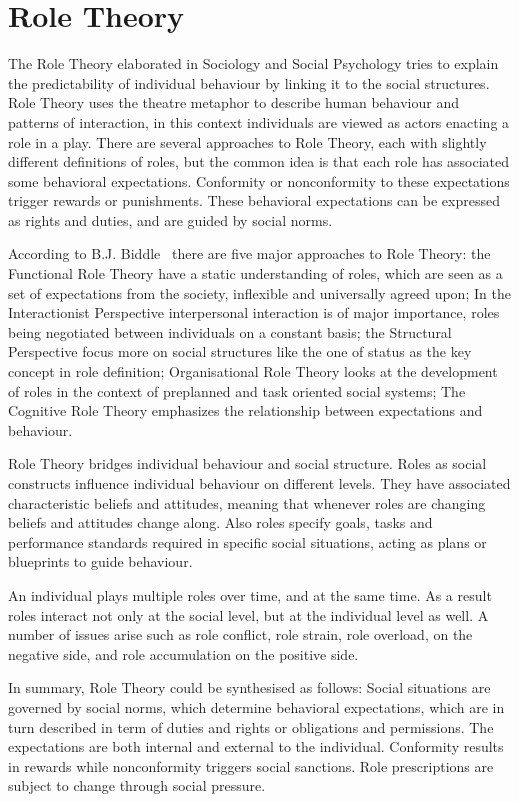 \documentclass[a4paper,12pt,oneside,fleqn]{book} %
\begin{document}
\section{Role Theory} %

The Role Theory elaborated in Sociology and Social Psychology tries to
explain the predictability of individual behaviour by linking it to the
social structures. Role Theory uses the theatre metaphor to describe human
behaviour and patterns of interaction, in this context individuals are
viewed as actors enacting a role in a play. There are several approaches to
Role Theory, each with slightly different definitions of roles, but the
common idea is that each role has associated some behavioral expectations.
Conformity or nonconformity to these expectations trigger rewards or
punishments. These behavioral expectations can be expressed as rights and
duties, and are guided by social norms.

According to B.J. Biddle~\cite{biddle1986recent} there are five major
approaches to Role Theory: the Functional Role Theory have a static
understanding of roles, which are seen as a set of expectations from the
society, inflexible and universally agreed upon; In the Interactionist
Perspective interpersonal interaction is of major importance, roles being
negotiated between individuals on a constant basis; the Structural
Perspective focus more on social structures like the one of status as the
key concept in role definition; Organisational Role Theory looks at the
development of roles in the context of preplanned and task oriented social
systems; The Cognitive Role Theory emphasizes the relationship between
expectations and behaviour.

Role Theory bridges individual behaviour and social structure. Roles as
social constructs influence individual behaviour on different levels. They
have associated characteristic beliefs and attitudes, meaning that whenever
roles are changing beliefs and attitudes change along. Also roles specify
goals, tasks and performance standards required in specific social
situations, acting as plans or blueprints to guide behaviour.

An individual plays multiple roles over time, and at the same time. As a
result roles interact not only at the social level, but at the individual
level as well. A number of issues arise such as role conflict, role strain,
role overload, on the negative side, and role accumulation on the positive
side.

In summary, Role Theory could be synthesised as follows: Social situations
are governed by social norms, which determine behavioral expectations,
which are in turn described in term of duties and rights or obligations and
permissions. The expectations are both internal and external to the
individual. Conformity results in rewards while nonconformity triggers
social sanctions. Role prescriptions are subject to change through social
pressure.
\end{document}
